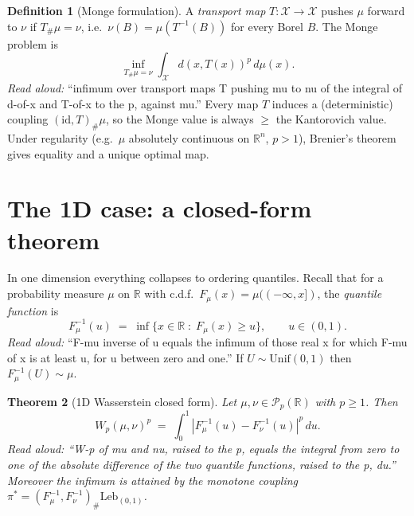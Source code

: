 \documentclass[11pt]{article}
\newtheorem{theorem}{Theorem}
\theoremstyle{definition}
\newtheorem{definition}[theorem]{Definition}
\theoremstyle{remark}
\begin{document}
\begin{definition}[Monge formulation]
A \emph{transport map} $T : \mathcal{X} \to \mathcal{X}$ pushes $\mu$ forward to $\nu$
if $T_\#\mu = \nu$, i.e.\ $\nu(B) = \mu(T^{-1}(B))$ for every Borel $B$.  The Monge
problem is
\[
\inf_{T_\#\mu = \nu} \int_{\mathcal{X}} d(x, T(x))^p \, d\mu(x).
\]
\emph{Read aloud:} ``infimum over transport maps T pushing mu to nu of the integral of d-of-x and T-of-x to the p, against mu.''
Every map $T$ induces a (deterministic) coupling $(\mathrm{id}, T)_\# \mu$, so the
Monge value is always $\geq$ the Kantorovich value.  Under regularity
(e.g.\ $\mu$ absolutely continuous on $\mathbb{R}^n$, $p > 1$), Brenier's theorem
gives equality and a unique optimal map.
\end{definition}

\section*{The 1D case: a closed-form theorem}

In one dimension everything collapses to ordering quantiles.  Recall that for a
probability measure $\mu$ on $\mathbb{R}$ with c.d.f.\ $F_\mu(x) = \mu((-\infty, x])$,
the \emph{quantile function} is
\[
F_\mu^{-1}(u) \;=\; \inf\{ x \in \mathbb{R} \;:\; F_\mu(x) \geq u \}, \qquad u \in (0,1).
\]
\emph{Read aloud:} ``F-mu inverse of u equals the infimum of those real x for which F-mu of x is at least u, for u between zero and one.''
If $U \sim \mathrm{Unif}(0,1)$ then $F_\mu^{-1}(U) \sim \mu$.

\begin{theorem}[1D Wasserstein closed form]
\label{thm:1d}
Let $\mu, \nu \in \mathcal{P}_p(\mathbb{R})$ with $p \geq 1$.  Then
\[
W_p(\mu, \nu)^p \;=\; \int_0^1 \left| F_\mu^{-1}(u) - F_\nu^{-1}(u) \right|^p \, du.
\]
\emph{Read aloud:} ``W-p of mu and nu, raised to the p, equals the integral from zero to one of the absolute difference of the two quantile functions, raised to the p, du.''
Moreover the infimum is attained by the \emph{monotone coupling}
$\pi^* = (F_\mu^{-1}, F_\nu^{-1})_\# \mathrm{Leb}_{(0,1)}$.
\end{theorem}
\end{document}
